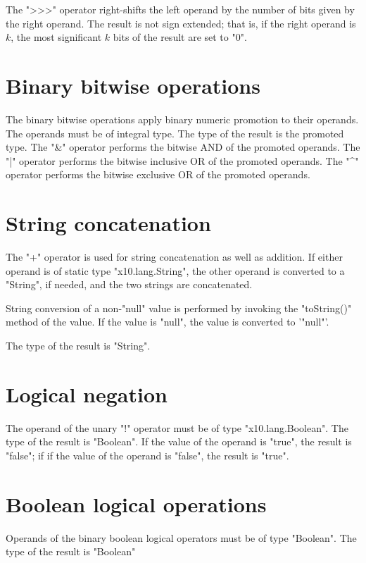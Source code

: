 The \xcd">>>" operator right-shifts the left operand by the number of
bits given by the right operand.  The result is not sign extended;
that is, if the right operand is $k$,
the most significant $k$ bits of the result are set to \xcd"0".

\section{Binary bitwise operations}

The binary bitwise operations apply binary numeric promotion
to their operands. The operands must be of integral type.
The type of the result is the promoted type.
The \xcd"&" operator  performs the bitwise AND of the promoted operands.
The \xcd"|" operator  performs the bitwise inclusive OR of the promoted operands.
The \xcd"^" operator  performs the bitwise exclusive OR of the promoted operands.

\section{String concatenation}

The \xcd"+"  operator is used for string concatenation 
 as well as addition.
If either operand is of static type \xcd"x10.lang.String",
 the other operand is converted to a \xcd"String", if needed,
  and  the two strings  are concatenated.

 String conversion of a non-\xcd"null" value is  performed by invoking the
 \xcd"toString()" method of the value.
  If the value is \xcd"null", the value is converted to 
  \xcd'"null"'.

The type of the result is \xcd"String".

\section{Logical negation}

The operand of the  unary \xcd"!" operator 
must be of type \xcd"x10.lang.Boolean".
The type of the result is \xcd"Boolean".
If the value of the operand is \xcd"true", the result is \xcd"false"; if
if the value of the operand  is \xcd"false", the result is \xcd"true".

\section{Boolean logical operations}

Operands of the binary boolean logical operators must be of type \xcd"Boolean".
The type of the result is \xcd"Boolean"


